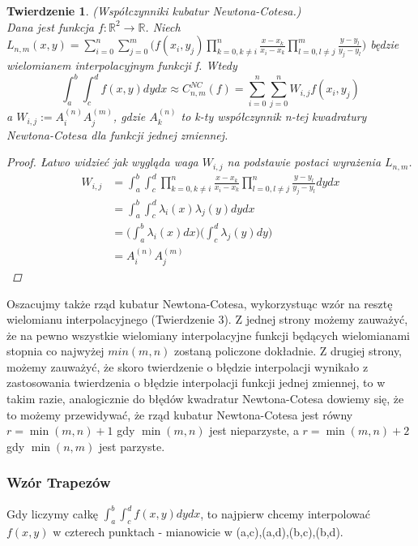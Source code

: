 \documentclass[10pt,wide]{mwart}
\newtheorem{tw}{Twierdzenie}
\theoremstyle{definition}
\begin{document}
\begin{tw} (Współczynniki kubatur Newtona-Cotesa.) \\
  Dana jest funkcja \(f: \mathbb{R}^2 \rightarrow \mathbb{R}\).
  Niech \(  L_{n,m}(x,y) = \sum_{i=0}^{n}\sum_{j=0}^m\Big(f(x_i,y_j)\prod_{k = 0, k\neq i}^{n}\frac{x-x_k}{x_i - x_k} \prod_{l=0, l \neq j}^{m}\frac{y-y_l}{y_j - y_l}\Big)\)
  będzie wielomianem interpolacyjnym funkcji f.
  Wtedy
  \begin{equation*}
    \int_a^b \int_c^d f(x,y) dy dx \approx C_{n,m}^{NC}(f) = \sum_{i=0}^{n}\sum_{j=0}^{n}W_{i,j}f(x_i,y_j)
  \end{equation*}
  a \(W_{i,j} := A_i^{(n)}A_j^{(m)}\), gdzie \(A_k^{(n)}\) to k-ty współczynnik n-tej kwadratury Newtona-Cotesa dla funkcji jednej zmiennej.
    \begin{proof}
    Łatwo widzieć jak wygląda waga \(W_{i,j}\) na podstawie postaci wyrażenia \(L_{n,m}\).
  \begin{equation*}
    \begin{split}
  W_{i,j} & = \int_a^b \int_c^d \prod_{k = 0, k\neq i}^{n}\frac{x-x_k}{x_i - x_k} \prod_{l=0, l \neq j}^{n}\frac{y-y_l}{y_j - y_l} dydx \\
  & = \int_a^b \int_c^d \lambda_i(x)\lambda_j(y) dy dx \\
  & = \Big(\int_a^b \lambda_i(x) dx\Big)\Big(\int_c^d \lambda_j(y)dy\Big) \\
  & = A_i^{(n)}A_j^{(m)}
    \end{split}
  \end{equation*}
\end{proof}
\end{tw}
Oszacujmy także rząd kubatur Newtona-Cotesa, wykorzystuąc wzór na resztę wielomianu interpolacyjnego (Twierdzenie 3).
Z jednej strony możemy zauważyć, że na pewno wszystkie wielomiany interpolacyjne funkcji będących wielomianami stopnia co najwyżej \(min(m,n)\) zostaną policzone dokładnie.
Z drugiej strony, możemy zauważyć, że skoro twierdzenie o błędzie interpolacji wynikało z zastosowania twierdzenia o błędzie interpolacji funkcji jednej zmiennej, to w takim razie, analogicznie do błędów kwadratur Newtona-Cotesa dowiemy się, że
to możemy przewidywać, że rząd kubatur Newtona-Cotesa jest równy \(r = \min(m,n)+1\) gdy \(\min(m,n)\) jest nieparzyste, a \(r = \min(m,n) + 2\) gdy \(\min(n,m)\) jest parzyste.
 \subsubsection{Wzór Trapezów}
 Gdy liczymy całkę \(\int_a^b \int_c^d f(x,y) dy dx\), to najpierw chcemy interpolować \(f(x,y)\) w czterech punktach - mianowicie w (a,c),(a,d),(b,c),(b,d).
\end{document}
